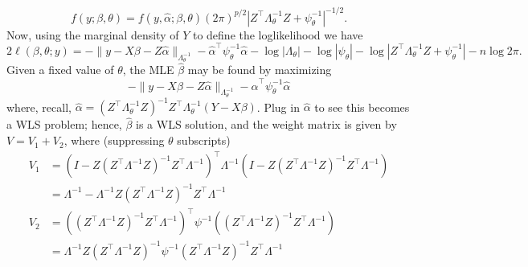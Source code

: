 \documentclass[
]{book}
\begin{document}
\[f(y;\beta, \theta) = f(y, \hat\alpha;\beta, \theta)(2\pi)^{p/2}|Z^\top \Lambda_\theta^{-1}Z+\psi_\theta^{-1}|^{-1/2}.\]
Now, using the marginal density of \(Y\) to define the loglikelihood we have
\[2\ell(\beta,\theta;y) = -\|y - X\beta - Z\hat\alpha\|_{\Lambda_\theta^{-1}}-\hat\alpha^\top \psi_\theta^{-1}\hat\alpha - \log|\Lambda_\theta|-\log|\psi_\theta|-\log|Z^\top\Lambda_\theta^{-1}Z+\psi_\theta^{-1}|-n\log 2\pi.\]
Given a fixed value of \(\theta\), the MLE \(\hat\beta\) may be found by maximizing
\[-\|y - X\beta - Z\hat\alpha\|_{\Lambda_\theta^{-1}}-\hat\alpha^\top \psi_\theta^{-1}\hat\alpha\]
where, recall, \(\hat\alpha = (Z^\top \Lambda_\theta^{-1}Z)^{-1}Z^\top \Lambda_\theta^{-1}(Y - X\beta)\). Plug in \(\hat\alpha\) to see this becomes a WLS problem; hence, \(\hat\beta\) is a WLS solution, and the weight matrix is given by \(V = V_1 + V_2\), where (suppressing \(\theta\) subscripts)
\begin{align*}
V_1 &= (I - Z(Z^\top \Lambda^{-1}Z)^{-1}Z^\top \Lambda^{-1})^\top \Lambda^{-1} (I - Z(Z^\top \Lambda^{-1}Z)^{-1}Z^\top \Lambda^{-1})\\
& = \Lambda^{-1} - \Lambda^{-1}Z(Z^\top \Lambda^{-1}Z)^{-1}Z^\top\Lambda^{-1}\\
V_2 &= ((Z^\top \Lambda^{-1}Z)^{-1}Z^\top \Lambda^{-1})^\top \psi^{-1} ((Z^\top \Lambda^{-1}Z)^{-1}Z^\top \Lambda^{-1})\\
& = \Lambda^{-1}Z(Z^\top \Lambda^{-1}Z)^{-1}\psi^{-1}(Z^\top \Lambda^{-1}Z)^{-1}Z^\top \Lambda^{-1}
\end{align*}
\end{document}
